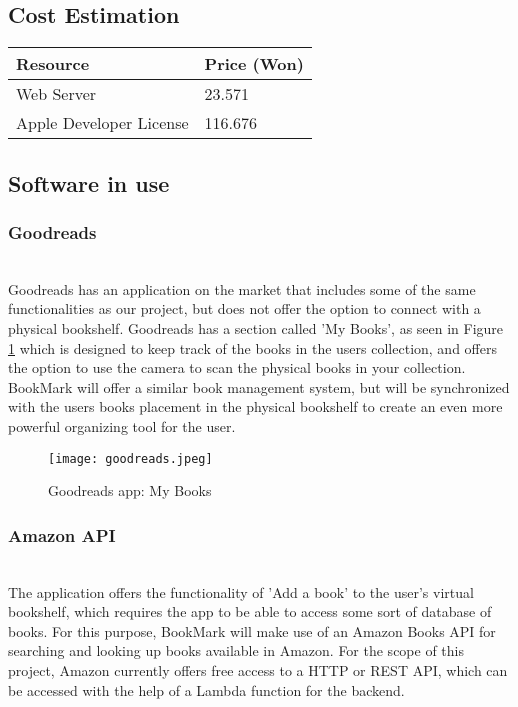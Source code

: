 \documentclass[conference]{IEEEtran}
\begin{document}
\subsection{Cost Estimation}
\hfill

\begin{center}
\begin{tabular}{ | m{4.6cm} | m{3cm}| } 

\hline
Resource & Price (Won) \\
 \hline
 Web Server  & 23.571 \\
 \hline
 Apple Developer License & 116.676 \\
 \hline
 
\end{tabular}
\end{center}

\hfill
\subsection{Software in use}
\subsubsection{Goodreads}\hfill\\

Goodreads has an application on the market that includes some of the same functionalities as our project, but does not offer the option to connect with a physical bookshelf. Goodreads has a section called 'My Books', as seen in Figure \ref{fig:goodreads} which is designed to keep track of the books in the users collection, and offers the option to use the camera to scan the physical books in your collection. BookMark will offer a similar book management system, but will be synchronized with the users books placement in the physical bookshelf to create an even more powerful organizing tool for the user. \\


\begin{figure}[h]
    \centering
    \texttt{[image: goodreads.jpeg]}
    \caption{Goodreads app: My Books}
    \label{fig:goodreads}
\end{figure}

\subsubsection{Amazon API}\hfill\\

The application offers the functionality of 'Add a book' to the user's virtual bookshelf, which requires the app to be able to access some sort of database of books. For this purpose, BookMark will make use of an Amazon Books API for searching and looking up books available in Amazon. For the scope of this project, Amazon currently offers free access to a HTTP or REST API, which can be accessed with the help of a Lambda function for the backend. \\
  
\end{document}
